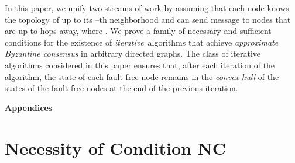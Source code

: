 \documentclass[letterpaper, 11pt]{article}
\begin{document}
In this paper, we unify two streams of work by assuming that each node knows the topology of up to its --th neighborhood and can send message to nodes that are up to  hops away, where . We prove a family of necessary and sufficient conditions for the existence
of {\em iterative}\, algorithms that achieve {\em approximate Byzantine consensus}
in arbitrary directed graphs.
The class of iterative algorithms considered in this paper ensures
that, after each iteration of the algorithm, the state of each fault-free node remains
in the {\em convex hull} of the states of the fault-free nodes at the end of
the previous iteration. 











\newpage
\appendix

\setlength {\parskip}{6pt}

\centerline{\Large\bf Appendices}
\section{Necessity of Condition NC}\label{app:necessary}
\end{document}
